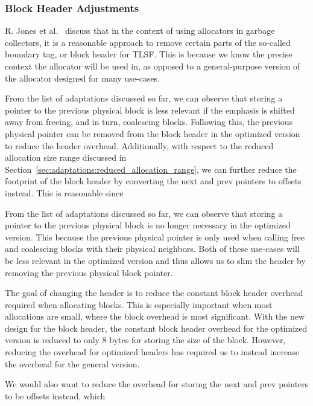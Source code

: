 \subsubsection{Block Header Adjustments}

R. Jones et al.~\cite[Page 103]{gchandbook} discuss that in the context of using allocators in garbage collectors, it is a reasonable approach to remove certain parts of the so-called boundary tag, or block header for TLSF. This is because we know the precise context the allocator will be used in, as opposed to a general-purpose version of the allocator designed for many use-cases.

From the list of adaptations discussed so far, we can observe that storing a pointer to the previous physical block is less relevant if the emphasis is shifted away from freeing, and in turn, coalescing blocks. Following this, the previous physical pointer can be removed from the block header in the optimized version to reduce the header overhead. Additionally, with respect to the reduced allocation size range discussed in Section~\ref{sec:adaptations:reduced_allocation_range}, we can further reduce the footprint of the block header by converting the next and prev pointers to offsets instead. This is reasonable since 

From the list of adaptations discussed so far, we can observe that storing a pointer to the previous physical block is no longer necessary in the optimized version. This because the previous physical pointer is only used when calling free and coalescing blocks with their physical neighbors. Both of these use-cases will be less relevant in the optimized version and thus allows us to slim the header by removing the previous physical block pointer.

The goal of changing the header is to reduce the constant block header overhead required when allocating blocks. This is especially important when most allocations are small, where the block overhead is most significant. With the new design for the block header, the constant block header overhead for the optimized version is reduced to only 8 bytes for storing the size of the block. However, reducing the overhead for optimized headers has required us to instead increase the overhead for the general version.


We would also want to reduce the overhead for storing the next and prev pointers to be offsets instead, which


